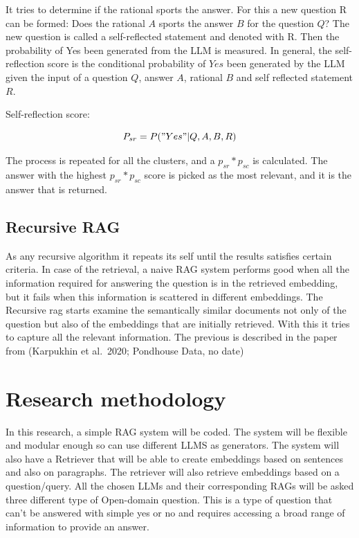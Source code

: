\documentclass{wseas}
\begin{document}
It tries to determine if the rational sports the answer. For this a new
question R can be formed: Does the rational $A$ sports the answer
$B$ for the question $Q$? The new question is called a
self-reflected statement and denoted with R. Then the probability of Yes
been generated from the LLM is measured. In general, the self-reflection
score is the conditional probability of $Yes$ been generated by the
LLM given the input of a question $Q$, answer $A$, rational $B$ and self
reflected statement $R$.

Self-reflection score: 

\begin{equation}
  P_{sr} = P("Yes"|Q, A, B, R)  
\end{equation}

The process is repeated for all the clusters, and a \(p_{sr}*p_{sc}\) is
calculated. The answer with the highest \(p_{sr}*p_{sc}\) score is
picked as the most relevant, and it is the answer that is returned.


\subsection{Recursive RAG}

As any recursive algorithm it repeats its self until the results
satisfies certain criteria. In case of the retrieval, a naive RAG system
performs good when all the information required for answering the
question is in the retrieved embedding, but it fails when this
information is scattered in different embeddings. The Recursive rag
starts examine the semantically similar documents not only of the
question but also of the embeddings that are initially retrieved. With
this it tries to capture all the relevant information. The previous is
described in the paper from (Karpukhin et al.~2020; Pondhouse Data, no
date) \cite{cite16} \cite{cite17}


\section{Research methodology}

In this research, a simple RAG system will be coded. The system will be
flexible and modular enough so can use different LLMS as generators. The
system will also have a Retriever that will be able to create embeddings
based on sentences and also on paragraphs. The retriever will also
retrieve embeddings based on a question/query. All the chosen LLMs and
their corresponding RAGs will be asked three different type of Open-domain
question. This is a type of question that can't be answered with simple
yes or no and requires accessing a broad range of information to provide
an answer.
\end{document}
